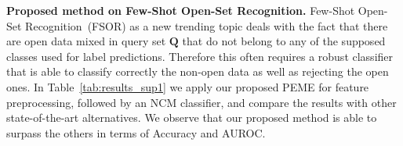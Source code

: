 \documentclass[review]{elsarticle}
\begin{document}
\begin{table}[h]
    \caption{Proposed method on backbones pre-trained with external data. Note that -$re$ denotes the re-implementation of an existing method.}
    \centering
    \label{tab:results_sillnet}
\end{table}

\textbf{Proposed method on Few-Shot Open-Set Recognition.} Few-Shot Open-Set Recognition~(FSOR) as a new trending topic deals with the fact that there are open data mixed in query set $\mathbf{Q}$ that do not belong to any of the supposed classes used for label predictions. Therefore this often requires a robust classifier that is able to classify correctly the non-open data as well as rejecting the open ones. In Table~\ref{tab:results_sup1} we apply our proposed PEME for feature preprocessing, followed by an NCM classifier, and compare the results with other state-of-the-art alternatives. We observe that our proposed method is able to surpass the others in terms of Accuracy and AUROC.
\end{document}

